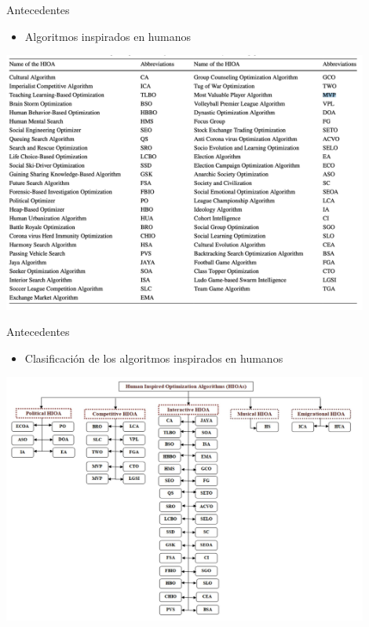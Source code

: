 \documentclass{beamer}
\begin{document}
\begin{frame}{Antecedentes}
    \begin{itemize}
        \item Algoritmos inspirados en humanos 
    \end{itemize}
    \vspace{0.5cm}
    \centering
    \includegraphics[width=0.9\textwidth]{human-inspired-list.png}
\end{frame}

\begin{frame}{Antecedentes}
    \begin{itemize}
        \item Clasificación de los algoritmos inspirados en humanos 
    \end{itemize}
    \vspace{0.5cm}
    \centering
    \includegraphics[width=0.9\textwidth]{human-inspired-class.png}
\end{frame}
\end{document}
